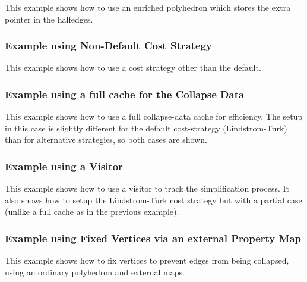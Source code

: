 This example shows how to use an enriched polyhedron which stores the extra pointer in the halfedges.


\subsubsection{Example using Non-Default Cost Strategy}

This example shows how to use a cost strategy other than the default.



\subsubsection{Example using a full cache for the Collapse Data}

This example shows how to use a full collapse-data cache for efficiency. The setup in this case is slightly different for the default cost-strategy (Lindstrom-Turk) than for alternative strategies, so both cases are shown.



\subsubsection{Example using a Visitor}

This example shows how to use a visitor to track the simplification process. It also shows how to setup the Lindstrom-Turk cost strategy but with a partial case (unlike a full cache as in the previous example).



\subsubsection{Example using Fixed Vertices via an external Property Map}

This example shows how to fix vertices to prevent edges from being collapsed, using an ordinary polyhedron and external maps.



